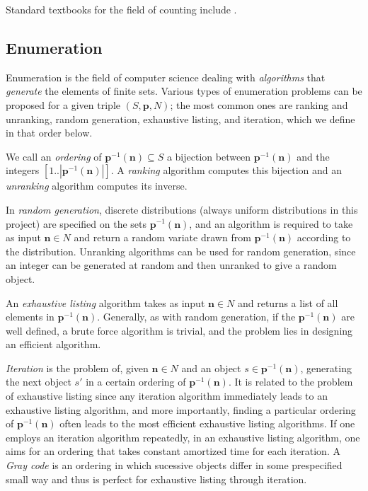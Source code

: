 \documentclass[12pt]{article}
\theoremstyle{plain}
\begin{document}
Standard textbooks for the field of counting include \cite{speciesbook, comtet, ac, stanley1, stanley2}.

\subsection{Enumeration}
\label{sec:enumeration}
Enumeration is the field of computer science dealing with
\emph{algorithms} that \emph{generate}
the elements of finite sets.
Various types of enumeration problems can be proposed for a given triple \( (S, \boldsymbol{p}, N) \);
the most common ones are ranking and unranking, random generation, exhaustive listing, and iteration,
which we define in that order below.

We call an \emph{ordering} of \( \boldsymbol{p}^{-1}(\boldsymbol{n}) \subseteq S \) a bijection between \( \boldsymbol{p}^{-1}(\boldsymbol{n}) \) and the integers \( [1..|\boldsymbol{p}^{-1}(\boldsymbol{n})| ] \).
A \emph{ranking} algorithm computes this bijection and an \emph{unranking} algorithm computes its inverse.

In \emph{random generation}, discrete distributions (always uniform distributions in this project) are specified on the sets \( \boldsymbol{p}^{-1}(\boldsymbol{n}) \),
and an algorithm is required to take as input \( \boldsymbol{n} \in N \) and return a random variate drawn from \( \boldsymbol{p}^{-1}(\boldsymbol{n}) \) according to the distribution.
Unranking algorithms can be used for random generation, since an integer can be generated at random and then unranked to give a random object.

An \emph{exhaustive listing} algorithm takes as input \( \boldsymbol{n} \in N \) and returns a list of all elements in
\( \boldsymbol{p}^{-1}(\boldsymbol{n}) \).
Generally, as with random generation, if the \(  \boldsymbol{p}^{-1}(\boldsymbol{n}) \) are well defined, a brute force algorithm is trivial, and the problem
lies in designing an efficient algorithm.

\emph{Iteration} is the problem of, given \( \boldsymbol{n} \in N\) and an object \(s \in \boldsymbol{p}^{-1}(\boldsymbol{n}) \), generating the next object \(s'\) in a certain ordering of \( \boldsymbol{p}^{-1}(\boldsymbol{n}) \).
It is related to the problem of exhaustive listing since any iteration algorithm immediately leads to an exhaustive listing algorithm, and more importantly, finding a particular ordering of \( \boldsymbol{p}^{-1}(\boldsymbol{n}) \)  often leads to the most efficient exhaustive listing algorithms.
If one employs an iteration algorithm repeatedly,
in an exhaustive listing algorithm,
one aims for an ordering that takes constant amortized time for each iteration.
A \emph{Gray code} is an ordering in which sucessive objects differ in some prespecified small way and thus is perfect for exhaustive listing through iteration.
\end{document}
